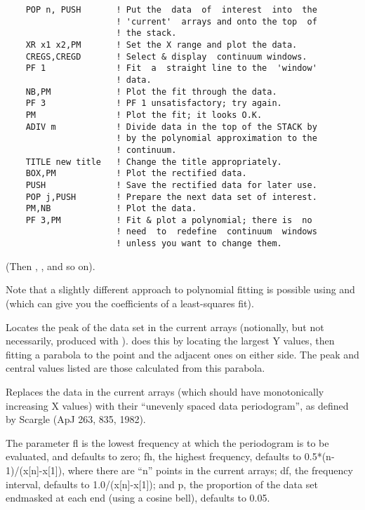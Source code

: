 \begin {description}
\begin{verbatim}
    POP n, PUSH       ! Put the  data  of  interest  into  the
                      ! 'current'  arrays and onto the top  of
                      ! the stack.
    XR x1 x2,PM       ! Set the X range and plot the data.
    CREGS,CREGD       ! Select & display  continuum windows.
    PF 1              ! Fit  a  straight line to the  'window'
                      ! data.
    NB,PM             ! Plot the fit through the data.
    PF 3              ! PF 1 unsatisfactory; try again.
    PM                ! Plot the fit; it looks O.K.
    ADIV m            ! Divide data in the top of the STACK by
                      ! by the polynomial approximation to the
                      ! continuum.
    TITLE new title   ! Change the title appropriately.
    BOX,PM            ! Plot the rectified data.
    PUSH              ! Save the rectified data for later use.
    POP j,PUSH        ! Prepare the next data set of interest.
    PM,NB             ! Plot the data.
    PF 3,PM           ! Fit & plot a polynomial; there is  no
                      ! need  to  redefine  continuum  windows
                      ! unless you want to change them.
\end{verbatim}

(Then ,  ,  and so on).

Note that a slightly different approach to polynomial fitting is
possible using   and   (which can give you the coefficients
of a least-squares fit).

Locates the peak of the data set in the current arrays (notionally, but
not necessarily, produced with ).    does this by locating
the largest Y values, then fitting a parabola to the point and the
adjacent ones on either side. The peak and central values listed are
those calculated from this parabola.

Replaces the data in the current arrays (which should have
monotonically increasing X values) with their ``unevenly spaced data
periodogram'', as defined by Scargle (ApJ 263, 835, 1982).

The parameter fl is the lowest frequency at which the periodogram is
to be evaluated, and defaults to zero; fh, the highest frequency,
defaults to 0.5*(n-1)/(x[n]-x[1]), where there are ``n'' points in the
current arrays; df, the frequency interval, defaults to
1.0/(x[n]-x[1]); and p, the proportion of the data set endmasked at
each end (using a cosine bell), defaults to 0.05.


\end{description}
